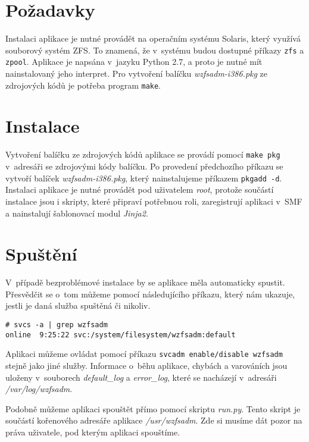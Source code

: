 \section{Požadavky}
Instalaci aplikace je nutné provádět na operačním systému Solaris, který využívá souborový systém ZFS. To znamená, že v~systému budou dostupné příkazy \verb|zfs| a \verb|zpool|. Aplikace je napsána v~jazyku Python 2.7, a proto je nutné mít nainstalovaný jeho interpret. Pro vytvoření balíčku \emph{wzfsadm-i386.pkg} ze zdrojových kódů je potřeba program \verb|make|.
\section{Instalace}
Vytvoření balíčku ze zdrojových kódů aplikace se provádí pomocí \verb|make pkg| v~adresáři se zdrojovými kódy balíčku. Po provedení předchozího příkazu se vytvoří balíček \emph{wzfsadm-i386.pkg}, který nainstalujeme příkazem \verb|pkgadd -d|. Instalaci aplikace je nutné provádět pod uživatelem \emph{root}, protože součástí instalace jsou i skripty, které připraví potřebnou roli, zaregistrují aplikaci v~SMF a nainstalují šablonovací modul \emph{Jinja2}.
\section{Spuštění}
V~případě bezproblémové instalace by se aplikace měla automaticky spustit. Přesvědčit se o~tom můžeme pomocí následujícího příkazu, který nám ukazuje, jestli je daná služba spuštěná či nikoliv.
\begin{verbatim}
# svcs -a | grep wzfsadm
online  9:25:22 svc:/system/filesystem/wzfsadm:default
\end{verbatim}
Aplikaci můžeme ovládat pomocí příkazu \verb|svcadm enable/disable wzfsadm| stejně jako jiné služby. Informace o~běhu aplikace, chybách a varováních jsou uloženy v~souborech \emph{default\_log} a \emph{error\_log}, které se nacházejí v~adresáři \emph{/var/log/wzfsadm}.

Podobně můžeme aplikaci spouštět přímo pomocí skriptu \emph{run.py}. Tento skript je součástí kořenového adresáře aplikace \emph{/usr/wzfsadm}. Zde si musíme dát pozor na práva uživatele, pod kterým aplikaci spouštíme.

